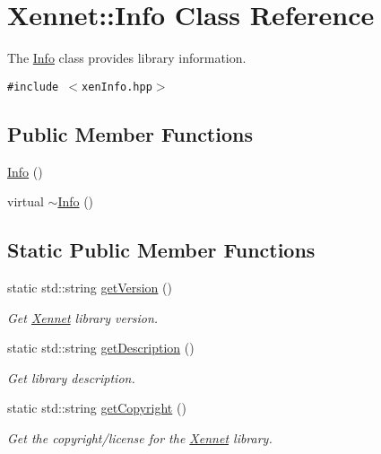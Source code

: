 \hypertarget{classXennet_1_1Info}{
\section{Xennet::Info Class Reference}
\label{classXennet_1_1Info}
}
The \hyperlink{classXennet_1_1Info}{Info} class provides library information.  


{\tt \#include $<$xenInfo.hpp$>$}

\subsection*{Public Member Functions}
\begin{CompactItemize}
\item 
\hyperlink{classXennet_1_1Info_f5528bca74d99b1b5ae7ca1c12be5ea6}{Info} ()
\item 
virtual \hyperlink{classXennet_1_1Info_9e8105b185d36f9474da4f1073aa86fb}{$\sim$Info} ()
\end{CompactItemize}
\subsection*{Static Public Member Functions}
\begin{CompactItemize}
\item 
static std::string \hyperlink{classXennet_1_1Info_180a53770171a6e9a799cce43fb29162}{getVersion} ()
\begin{CompactList}\small\item\em Get \hyperlink{namespaceXennet}{Xennet} library version. \item\end{CompactList}\item 
static std::string \hyperlink{classXennet_1_1Info_b21e95c576ae048cd14918543b6cafc8}{getDescription} ()
\begin{CompactList}\small\item\em Get library description. \item\end{CompactList}\item 
static std::string \hyperlink{classXennet_1_1Info_f53b1dc1edc80f1068fa5fc59820333f}{getCopyright} ()
\begin{CompactList}\small\item\em Get the copyright/license for the \hyperlink{namespaceXennet}{Xennet} library. \item\end{CompactList}\end{CompactItemize}


